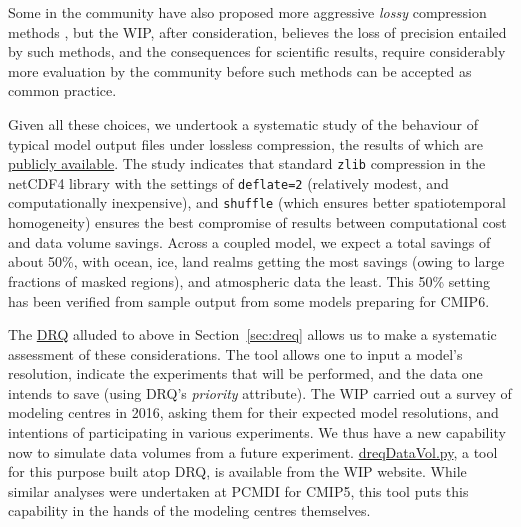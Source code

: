 \documentclass[gmd,manuscript]{copernicus}
\newcommand{\pipref}[1] {\citep{ref:#1}}
\newcommand{\secref}[1] {\mbox{Section  \ref{sec:#1}}}
\begin{document}
\begin{enumerate}
  Some in the community have also proposed more aggressive
  \emph{lossy} compression methods \pipref{bakeretal2016}, but the
  WIP, after consideration, believes the loss of precision entailed by
  such methods, and the consequences for scientific results, require
  considerably more evaluation by the community before such methods
  can be accepted as common practice.

  Given all these choices, we undertook a systematic study of the
  behaviour of typical model output files under lossless compression,
  the results of which are \href{https://goo.gl/qkdDnn}{publicly
    available}. The study indicates that standard \texttt{zlib}
  compression in the netCDF4 library with the settings of
  \texttt{deflate=2} (relatively modest, and computationally
  inexpensive), and \texttt{shuffle} (which ensures better
  spatiotemporal homogeneity) ensures the best compromise of results
  between computational cost and data volume savings. Across a coupled
  model, we expect a total savings of about 50\%, with ocean, ice,
  land realms getting the most savings (owing to large fractions of
  masked regions), and atmospheric data the least. This 50\% setting
  has been verified from sample output from some models preparing for
  CMIP6.
\end{enumerate}

The \href{https://goo.gl/iNBQ9m}{DRQ} alluded to above in
\secref{dreq} allows us to make a systematic assessment of these
considerations. The tool allows one to input a model's resolution,
indicate the experiments that will be performed, and the data
one intends to save (using DRQ's \emph{priority} attribute). The WIP
carried out a survey of modeling centres in 2016, asking them for
their expected model resolutions, and intentions of participating in
various experiments. We thus have a new capability now to
simulate data volumes from a future experiment.
\href{https://goo.gl/Ezz5v3}{dreqDataVol.py}, a tool for this purpose
built atop DRQ, is available from the WIP website. While similar
analyses were undertaken at PCMDI for CMIP5, this tool puts this
capability in the hands of the modeling centres themselves.
\end{document}
